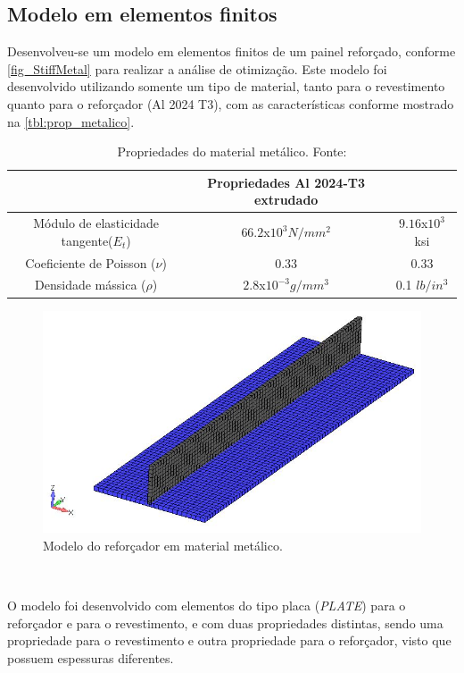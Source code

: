 {\subsection{Modelo em elementos finitos}
Desenvolveu-se um modelo em elementos finitos de um painel reforçado, conforme \autoref{fig_StiffMetal} para realizar a análise de otimização. Este modelo foi desenvolvido utilizando somente um tipo de material, tanto para o revestimento quanto para o reforçador (Al 2024 T3), com as características conforme mostrado na \autoref{tbl:prop_metalico}.

\begin{table}[h]
\centering
\begin{tabular}{ccc}
\toprule
& Propriedades Al 2024-T3 extrudado \\ \midrule
Módulo de elasticidade tangente($E_t$) & $66.2$x$10^3N/mm^2$ & $9.16$x$10^3$ ksi \\
Coeficiente de Poisson ($\nu$) & 0.33 & 0.33\\
Densidade mássica ($\rho$)  & $2.8$x$10^{-3} g/mm^3$ & 0.1 $lb/in^3$ \\
\bottomrule
\end{tabular}
\caption{Propriedades do material metálico. Fonte:\cite{rice2003metallic}}
\label{tbl:prop_metalico}
\end{table}

\begin{figure}[ht]
	\caption{\label{fig_StiffMetal}Modelo do reforçador em material metálico.}
  \centering
  \includegraphics[scale=0.7]{figura/StiffMetal}
\end{figure}
\

O modelo foi desenvolvido com elementos do tipo placa (\emph{PLATE}) para o reforçador e para o revestimento, e com duas propriedades distintas, sendo uma propriedade para o revestimento e outra propriedade para o reforçador, visto que possuem espessuras diferentes.

}
